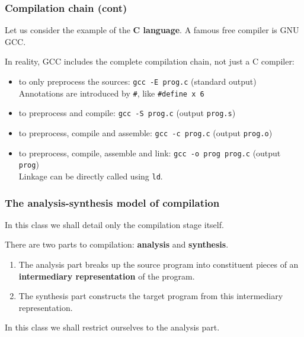 %
\begin{frame}[containsverbatim]
\frametitle{Compilation chain (cont)}

Let us consider the example of the \textbf{C language}. A famous free
compiler is GNU GCC.

\bigskip

In reality, GCC includes the complete compilation chain, not just a C
compiler:
\begin{itemize}

  \item to only preprocess the sources: \verb+gcc -E prog.c+
  (standard output)\\
  Annotations are introduced by \verb+#+, like \verb+#define x 6+

  \item to preprocess and compile: \verb+gcc -S prog.c+ (output
  \verb+prog.s+)

  \item to preprocess, compile and assemble: \verb+gcc -c prog.c+
  (output \verb+prog.o+)

  \item to preprocess, compile, assemble and link:
  \verb+gcc -o prog prog.c+ (output \verb+prog+)\\
  Linkage can  be directly called using \verb+ld+.

\end{itemize}

\end{frame}

%
\begin{frame}
\frametitle{The analysis-synthesis model of compilation}

In this class we shall detail only the compilation stage itself.

\bigskip

There are two parts to compilation: \textbf{analysis} and
\textbf{synthesis}.
\begin{enumerate}

  \item The analysis part breaks up the source program into
  constituent pieces of an \textbf{intermediary representation} of the
  program.

  \item The synthesis part constructs the target program from this
  intermediary representation.

\end{enumerate}
In this class we shall restrict ourselves to the analysis part.

\end{frame}


